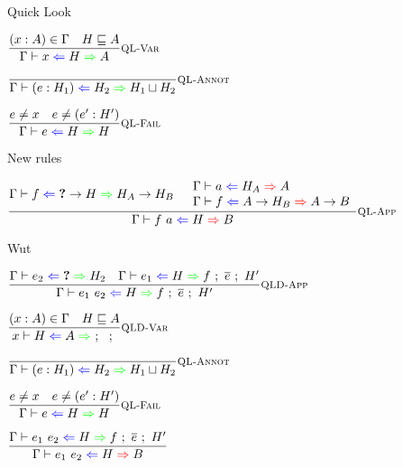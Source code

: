 \documentclass{beamer}
\begin{document}
\begin{frame}{Quick Look}

\begin{center}
  $\infrule[QL-Var]{\sidecond{(x : A) \in \Gamma} \quad \sidecond{\hintorder{H}{A}}}{\quicklookhinting{x}{H}{A}}$

  \vspace{2em}

  $\infrule[QL-Annot]{}{\quicklookhinting{\annot{e}{H_1}}{H_2}{\hintlub{H_1}{H_2}}}$

  \vspace{2em}

  $\infrule[QL-Fail]{\sidecond{e \neq x} \quad \sidecond{e \neq \annot{e'}{H'}}}{\quicklookhinting{e}{H}{H}}$
\end{center}

\end{frame}

\begin{frame}{New rules}

\begin{center}
  $\infrule[QL-App]{\quicklookhinting{f}{\Fun{\Hole}{H}}{\Fun{H_A}{H_B}} \quad \begin{array}{l} \hinting{a}{H_A}{A} \\ \hinting{f}{\Fun{A}{H_B}}{\Fun{A}{B}} \end{array}}{\hinting{\app{f}{a}}{H}{B}}$
\end{center}

\end{frame}

\newcommand{\qldeep}[6]{#1 \vdash #2 \mathcolor{blue}{\Leftarrow} #3 \mathcolor{green}{\Rightarrow} #4\ ;\ #5\ ;\ #6}

\begin{frame}{Wut}

\begin{center}
  $\infrule[QLD-App]{\quicklookhinting{e_2}{\Hole}{H_2} \quad \qldeep{\Gamma}{e_1}{H}{f}{\overline{e}}{H'}}{\qldeep{\Gamma}{\app{e_1}{e_2}}{H}{f}{\overline{e}}{H'}}$

  \vspace{2em}

  $\infrule[QLD-Var]{\sidecond{(x : A) \in \Gamma} \quad \sidecond{\hintorder{H}{A}}}{\qldeep{x}{H}{A}{}{}{}}$

  \vspace{2em}

  $\infrule[QL-Annot]{}{\quicklookhinting{\annot{e}{H_1}}{H_2}{\hintlub{H_1}{H_2}}}$

  \vspace{2em}

  $\infrule[QL-Fail]{\sidecond{e \neq x} \quad \sidecond{e \neq \annot{e'}{H'}}}{\quicklookhinting{e}{H}{H}}$

  \vspace{2em}

  $\infrule{\qldeep{\Gamma}{\app{e_1}{e_2}}{H}{f}{\overline{e}}{H'}}{\hinting{\app{e_1}{e_2}}{H}{B}}$
\end{center}

\end{frame}
\end{document}
